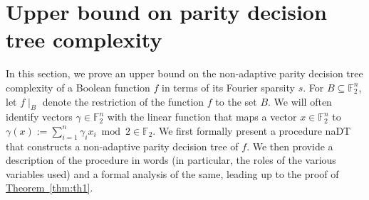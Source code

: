 \documentclass[11pt]{article}
\numberwithin{equation}{section}
\theoremstyle{definition}
\theoremstyle{plain}
\newcommand{\lref}[2][]{\hyperref[#2]{#1~\ref*{#2}}}
\newcommand{\F}{{\mathbb F}}
\begin{document}
\section{Upper bound on parity decision tree complexity} %
\label{themain}
In this section, we %
prove an upper bound on the non-adaptive parity decision tree
complexity of a Boolean function $f$ in terms of its Fourier sparsity $s$. For $B \subseteq \F_2^n$, let $f \mid_B$ denote the restriction of the function $f$ to the set $B$. We will often identify vectors $\gamma \in \F_2^n$ with the linear function that maps a vector $x \in \F_2^n$ to $\gamma(x):=\sum_{i=1}^n \gamma_ix_i \bmod 2 \in \F_2$. We first formally present a procedure {\sc naDT} that constructs a non-adaptive
parity decision tree of $f$. We then provide a description of the procedure in words (in particular, the roles of the various variables used) and a formal analysis of the same, leading up to the proof of \lref[Theorem]{thm:th1}.
\end{document}
